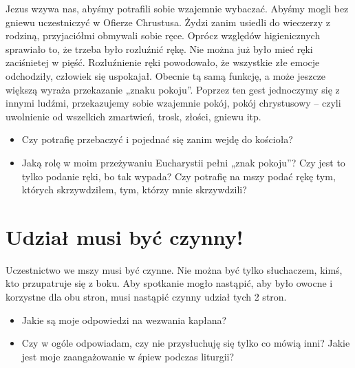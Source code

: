 \documentclass[a5paper,10pt,polish]{book}
\begin{document}
Jezus wzywa nas, abyśmy potrafili sobie wzajemnie wybaczać. Abyśmy mogli bez gniewu uczestniczyć w Ofierze Chrustusa. Żydzi zanim usiedli do wieczerzy z rodziną, przyjaciółmi obmywali sobie ręce. Oprócz względów higienicznych sprawiało to, że trzeba było rozluźnić rękę. Nie można już było mieć ręki zaciśnietej w pięść. Rozluźnienie ręki powodowało, że wszystkie złe emocje odchodziły, człowiek się uspokajał. Obecnie tą samą funkcję, a może jeszcze większą wyraża przekazanie „znaku pokoju”. Poprzez ten gest jednoczymy się z innymi ludźmi, przekazujemy sobie wzajemnie pokój, pokój chrystusowy – czyli uwolnienie od wszelkich zmartwień, trosk, złości, gniewu itp.
\begin{itemize}
\item {} 
Czy potrafię przebaczyć i pojednać się zanim wejdę do kościoła?

\item {} 
Jaką rolę w moim przeżywaniu Eucharystii pełni „znak pokoju”? Czy jest to tylko podanie ręki, bo tak wypada? Czy potrafię na mszy podać rękę tym, których skrzywdziłem, tym, którzy mnie skrzywdzili?

\end{itemize}


\section{Udział musi być czynny!}
\label{babice2006-jesien-knurow/spotkanie3:udzial-musi-byc-czynny}
Uczestnictwo we mszy musi być czynne. Nie można być tylko słuchaczem, kimś, kto przupatruje się z boku. Aby spotkanie mogło nastąpić, aby było owocne i korzystne dla obu stron, musi nastąpić czynny udział tych 2 stron.
\begin{itemize}
\item {} 
Jakie są moje odpowiedzi na wezwania kapłana?

\item {} 
Czy w ogóle odpowiadam, czy nie przysłuchuję się tylko co mówią inni? Jakie jest moje zaangażowanie w śpiew podczas liturgii?

\end{itemize}
\end{document}
